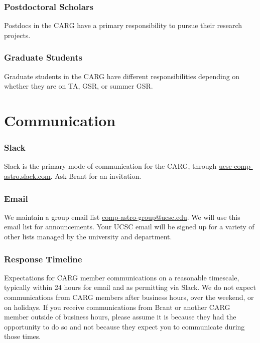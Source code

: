 \documentclass[fleqn,10pt]{wlscirep}
\begin{document}
\subsubsection{Postdoctoral Scholars}

Postdocs in the CARG have
a primary responsibility
to pursue their research 
projects.

\subsubsection{Graduate Students}

Graduate students in the CARG have
different responsibilities
depending on whether they
are on TA, GSR, or summer GSR.


\newpage
\section{Communication}
\label{sec:communication}


\subsubsection{Slack}
Slack is the primary mode
of communication for the CARG,
through \href{http://ucsc-comp-astro.slack.com}{ucsc-comp-astro.slack.com}.
Ask Brant for an invitation.

\subsubsection{Email}
We maintain a group email
list \href{mailto:comp-astro-group@ucsc.edu}{comp-astro-group@ucsc.edu}.
We will use this email list for
announcements. Your UCSC email
will be signed up for a variety
of other lists managed by the
university and department.

\subsubsection{Response Timeline}
Expectations for CARG member
communications on a reasonable timescale, typically within
24 hours for email and as
permitting via Slack.
We do not expect communications
from CARG members after business
hours, over the weekend, or
on holidays. If you receive
communications from Brant or
another CARG member outside of
business hours, please assume
it is because
they had the opportunity
to do so and not because they
expect you to communicate during
those times.
\end{document}
